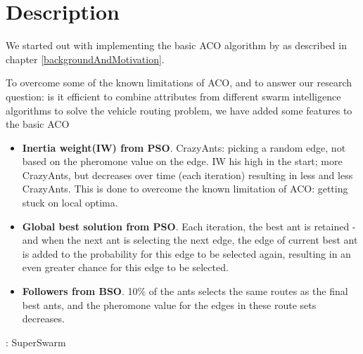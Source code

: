 \section{Description}

We started out with implementing the basic ACO algorithm by \citet{nanda11} as described in chapter \ref{backgroundAndMotivation}.

To overcome some of the known limitations of ACO, and to answer our research question: is it efficient to combine attributes from different swarm intelligence algorithms to solve the vehicle routing problem, we have added some features to the basic ACO

\begin{itemize}
\item \textbf{Inertia weight(IW) from PSO}. CrazyAnts: picking a random edge, not based on the pheromone value on the edge. IW his high in the start; more CrazyAnts, but decreases over time (each iteration) resulting in less and less CrazyAnts. This is done to overcome the known limitation of ACO: getting stuck on local optima.
\item \textbf{Global best solution from PSO}. Each iteration, the best ant is retained - and when the next ant is selecting the next edge, the edge of current best ant is added to the probability for this edge to be selected again, resulting in an even greater chance for this edge to be selected.
\item \textbf{Followers from BSO}. 10\% of the ants selects the same routes as the final best ants, and the pheromone value for the edges in these route sets decreases.
\end{itemize}

: SuperSwarm



